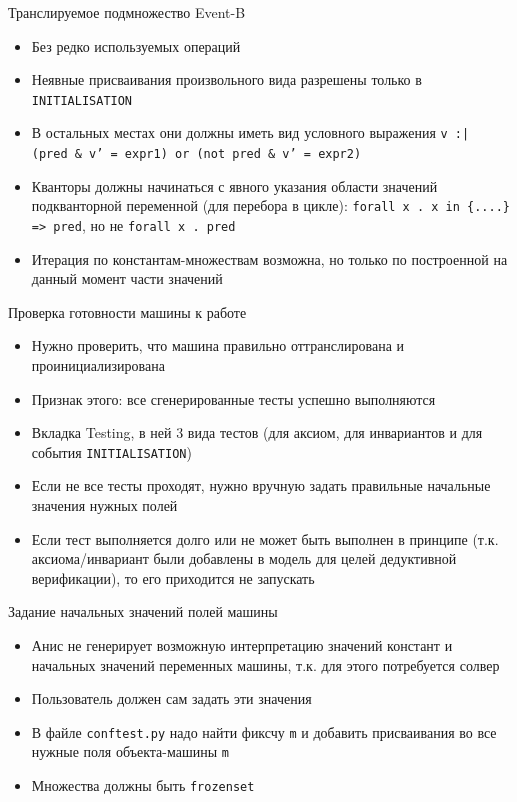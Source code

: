 \documentclass[hyperref={unicode=true}]{beamer}
\begin{document}
    \begin{frame}{Транслируемое подмножество Event-B}
    \begin{itemize}
    \item Без редко используемых операций
    \item Неявные присваивания произвольного вида разрешены
          только в \texttt{INITIALISATION}
    \item В остальных местах они должны иметь вид условного выражения
          \texttt{v :| (pred \& v' = expr1) or (not pred \& v' = expr2)}
    \item Кванторы должны начинаться с явного указания
          области значений подкванторной переменной (для перебора в цикле):
          \texttt{forall x . x in \{....\} => pred}, но не \texttt{forall x . pred}
    \item Итерация по константам-множествам возможна, но только
          по построенной на данный момент части значений 
    \end{itemize}
    \end{frame}

    \begin{frame}{Проверка готовности машины к работе}
    \begin{itemize}
    \item Нужно проверить, что машина правильно оттранслирована
          и проинициализирована
    \item Признак этого: все сгенерированные тесты успешно выполняются
    \item Вкладка Testing, в ней 3 вида тестов (для аксиом, для
          инвариантов и для события \texttt{INITIALISATION})
    \item Если не все тесты проходят, нужно вручную задать правильные
          начальные значения нужных полей
    \item Если тест выполняется долго или не может быть выполнен в принципе
          (т.к. аксиома/инвариант были добавлены в модель для целей
          дедуктивной верификации), то его приходится не запускать
    \end{itemize}
    \end{frame}

    \begin{frame}{Задание начальных значений полей машины}
    \begin{itemize}
    \item Анис не генерирует возможную интерпретацию значений
          констант и начальных значений переменных машины, т.к.
          для этого потребуется солвер
    \item Пользователь должен сам задать эти значения
    \item В файле \texttt{conftest.py} надо найти фиксчу \texttt{m}
          и добавить присваивания во все нужные поля объекта-машины \texttt{m}
    \item Множества должны быть \texttt{frozenset}
    \end{itemize}
    \end{frame}
\end{document}
